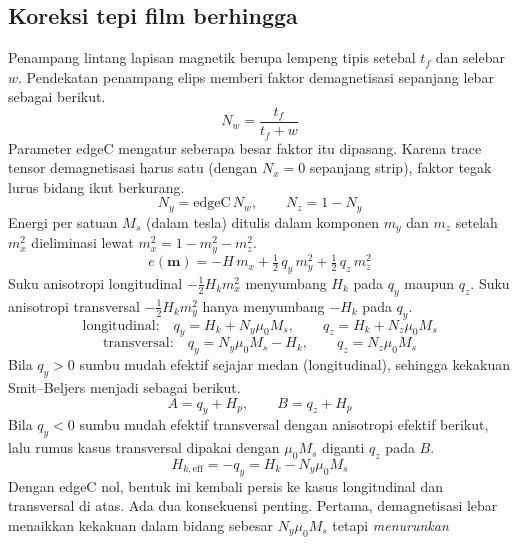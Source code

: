 \documentclass[a4paper,11pt]{article}
\begin{document}
\subsection{Koreksi tepi film berhingga}
Penampang lintang lapisan magnetik berupa lempeng tipis setebal $t_{f}$
dan selebar $w$. Pendekatan penampang elips memberi faktor demagnetisasi
sepanjang lebar sebagai berikut.
\begin{equation*}
N_{w} = \frac{t_{f}}{t_{f}+w}
\end{equation*}
Parameter edgeC mengatur seberapa besar faktor itu dipasang.
Karena trace tensor demagnetisasi harus satu (dengan $N_{x}=0$ sepanjang strip),
faktor tegak lurus bidang ikut berkurang.
\begin{equation*}
N_{y} = \mathrm{edgeC}\,N_{w},\qquad N_{z} = 1-N_{y}
\end{equation*}
Energi per satuan $M_{s}$ (dalam tesla) ditulis dalam komponen $m_{y}$ dan
$m_{z}$ setelah $m_{x}^{2}$ dieliminasi lewat $m_{x}^{2}=1-m_{y}^{2}-m_{z}^{2}$.
\begin{equation*}
e(\mathbf m) = -H\,m_{x}+\tfrac12\,q_{y}\,m_{y}^{2}+\tfrac12\,q_{z}\,m_{z}^{2}
\end{equation*}
Suku anisotropi longitudinal $-\tfrac12H_{k}m_{x}^{2}$ menyumbang $H_{k}$
pada $q_{y}$ maupun $q_{z}$. Suku anisotropi transversal
$-\tfrac12H_{k}m_{y}^{2}$ hanya menyumbang $-H_{k}$ pada $q_{y}$.
\begin{equation*}
\text{longitudinal:}\quad q_{y}=H_{k}+N_{y}\mu_{0}M_{s},\qquad
q_{z}=H_{k}+N_{z}\mu_{0}M_{s}
\end{equation*}
\begin{equation*}
\text{transversal:}\quad q_{y}=N_{y}\mu_{0}M_{s}-H_{k},\qquad
q_{z}=N_{z}\mu_{0}M_{s}
\end{equation*}
Bila $q_{y}>0$ sumbu mudah efektif sejajar medan (longitudinal), sehingga
kekakuan Smit--Beljers menjadi sebagai berikut.
\begin{equation*}
A = q_{y}+H_{p},\qquad B = q_{z}+H_{p}
\end{equation*}
Bila $q_{y}<0$ sumbu mudah efektif transversal dengan anisotropi efektif berikut,
lalu rumus kasus transversal dipakai dengan $\mu_{0}M_{s}$ diganti $q_{z}$ pada $B$.
\begin{equation*}
H_{k,\mathrm{eff}} = -q_{y} = H_{k}-N_{y}\mu_{0}M_{s}
\end{equation*}
Dengan edgeC nol, bentuk ini kembali persis ke kasus longitudinal dan transversal
di atas. Ada dua konsekuensi penting. Pertama, demagnetisasi lebar menaikkan
kekakuan dalam bidang sebesar $N_{y}\mu_{0}M_{s}$ tetapi \emph{menurunkan}
\end{document}
